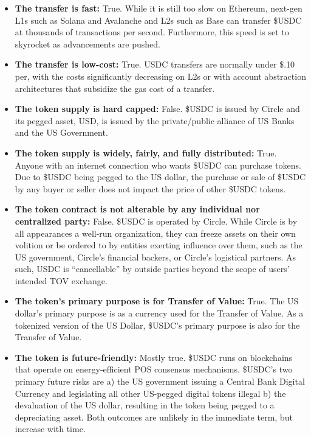\documentclass{article}
\begin{document}
\begin{itemize}
\item \textbf{The transfer is fast:} True. While it is still too slow on Ethereum, next-gen L1s such as Solana and Avalanche and L2s such as Base can transfer \$USDC at thousands of transactions per second. Furthermore, this speed is set to skyrocket as advancements are pushed.
\item \textbf{The transfer is low-cost:} True. USDC transfers are normally under \$.10 per, with the costs significantly decreasing on L2s or with account abstraction architectures that subsidize the gas cost of a transfer.
\item \textbf{The token supply is hard capped:} False. \$USDC is issued by Circle and its pegged asset, USD, is issued by the private/public alliance of US Banks and the US Government.
\item \textbf{The token supply is widely, fairly, and fully distributed:} True. Anyone with an internet connection who wants \$USDC can purchase tokens. Due to \$USDC being pegged to the US dollar, the purchase or sale of \$USDC by any buyer or seller does not impact the price of other \$USDC tokens.
\item \textbf{The token contract is not alterable by any individual nor centralized party:} False. \$USDC is operated by Circle. While Circle is by all appearances a well-run organization, they can freeze assets on their own volition or be ordered to by entities exerting influence over them, such as the US government, Circle's financial backers, or Circle's logistical partners. As such, USDC is ``cancellable'' by outside parties beyond the scope of users' intended TOV exchange.
\item \textbf{The token's primary purpose is for Transfer of Value:} True. The US dollar's primary purpose is as a currency used for the Transfer of Value. As a tokenized version of the US Dollar, \$USDC's primary purpose is also for the Transfer of Value.
\item \textbf{The token is future-friendly:} Mostly true. \$USDC runs on blockchains that operate on energy-efficient POS consensus mechanisms. \$USDC's two primary future risks are a) the US government issuing a Central Bank Digital Currency and legislating all other US-pegged digital tokens illegal b) the devaluation of the US dollar, resulting in the token being pegged to a depreciating asset. Both outcomes are unlikely in the immediate term, but increase with time.
\end{itemize}
\end{document}
